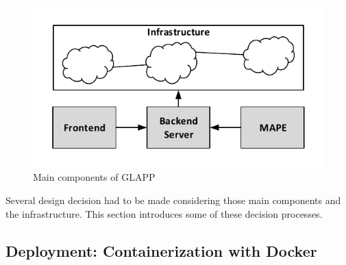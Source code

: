 \documentclass{seal_thesis}
\begin{document}
\begin{figure}[!ht]
\centering
	\includegraphics{simple_architecture.pdf}
	\caption{Main components of GLAPP}
	\label{fig:simple}
\end{figure}

Several design decision had to be made considering those main components and the infrastructure. This section introduces some of these decision processes.



\subsection{Deployment: Containerization with Docker}
\end{document}
